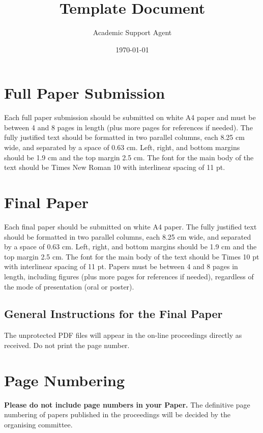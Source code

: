 \documentclass{article}
\title{Template Document}
\author{Academic Support Agent}
\date{\today}
\begin{document}
\maketitle

\maketitleabstract

\section{Full Paper Submission}

Each full paper submission should be submitted on white A4 paper and must be between 4 and 8 pages in length (plus more pages for references if needed). 
The fully
justified text should be formatted in two parallel columns, each 8.25 cm wide,
and separated by a space of 0.63 cm. Left, right, and bottom margins should be
1.9 cm and the top margin 2.5 cm. The font for the main body of the text should
be Times New Roman 10 with interlinear spacing of 11 pt. 


\section{ Final Paper}

Each final paper should be submitted on white A4 paper. The fully justified text should be formatted in two parallel columns, each 8.25 cm wide, and separated by a space of 0.63 cm. Left, right, and bottom margins should be 1.9 cm and the top margin 2.5 cm. The font for the main body of the text should be Times 10 pt with interlinear spacing of 11 pt. Papers must be between 4 and 8 pages in length, including figures (plus more pages for references if needed), regardless of the mode of presentation (oral or poster).

\subsection{General Instructions for the Final Paper}
The unprotected PDF files will appear in the
on-line proceedings directly as received. Do not print the page number.

\section{Page Numbering}

\textbf{Please do not include page numbers in your Paper.} The definitive page
numbering of papers published in the proceedings will be decided by the
organising committee.
\end{document}
